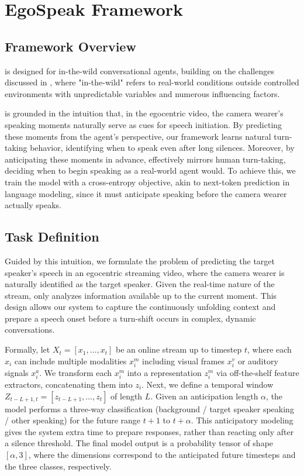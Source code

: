\section{EgoSpeak Framework}
\label{sec:method}

\subsection{Framework Overview}
\frameworkname is designed for in-the-wild conversational agents, building on the challenges discussed in , where "in-the-wild" refers to real-world conditions outside controlled environments with unpredictable variables and numerous influencing factors.

\frameworkname is grounded in the intuition that, in the egocentric video, the camera wearer’s speaking moments naturally serve as cues for speech initiation. By predicting these moments from the agent’s perspective, our framework learns natural turn-taking behavior, identifying when to speak even after long silences. Moreover, by anticipating these moments in advance, \frameworkname effectively mirrors human turn-taking, deciding when to begin speaking as a real-world agent would. To achieve this, we train the model with a cross-entropy objective, akin to next-token prediction in language modeling, since it must anticipate speaking before the camera wearer actually speaks.

\subsection{Task Definition}
Guided by this intuition, we formulate the problem of predicting the target speaker's speech in an egocentric streaming video, where the camera wearer is naturally identified as the target speaker. Given the real-time nature of the stream, \frameworkname only analyzes information available up to the current moment. This design allows our system to capture the continuously unfolding context and prepare a speech onset before a turn-shift occurs in complex, dynamic conversations.

Formally, let $X_t = [x_1, \ldots, x_t]$ be an online stream up to timestep $t$, where 
each $x_i$ can include multiple modalities $x^m_i$ including visual frames $x^v_i$ or auditory signals $x^a_i$. We transform each $x^m_i$ into a representation $z^m_i$ via off-the-shelf feature extractors, concatenating them into $z_i$. Next, we define a temporal window $Z_{t-L+1,t} = [z_{t-L+1}, \ldots, z_t]$ of length $L$. 
Given an anticipation length $\alpha$, the model performs a three-way classification (background / target speaker speaking / other speaking) for the future range $t+1$ to $t+\alpha$. This anticipatory modeling gives the system extra time to prepare responses, rather than reacting only after a silence threshold. The final model output is a probability tensor of shape $[\alpha, 3]$, where the dimensions correspond to the anticipated future timesteps and the three classes, respectively.




